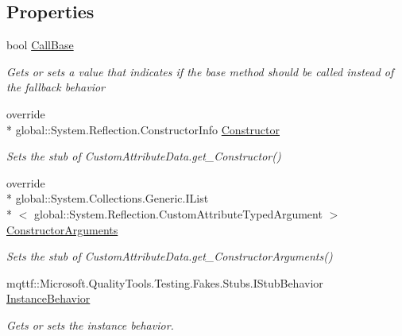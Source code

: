 \subsection*{Properties}
\begin{DoxyCompactItemize}
\item 
bool \hyperlink{class_system_1_1_reflection_1_1_fakes_1_1_stub_custom_attribute_data_a84a629870a52cfff5e484e0fcab8e341}{Call\-Base}
\begin{DoxyCompactList}\small\item\em Gets or sets a value that indicates if the base method should be called instead of the fallback behavior\end{DoxyCompactList}\item 
override \\*
global\-::\-System.\-Reflection.\-Constructor\-Info \hyperlink{class_system_1_1_reflection_1_1_fakes_1_1_stub_custom_attribute_data_a1681ed6a40caec10be6109b5d85ccddd}{Constructor}
\begin{DoxyCompactList}\small\item\em Sets the stub of Custom\-Attribute\-Data.\-get\-\_\-\-Constructor()\end{DoxyCompactList}\item 
override \\*
global\-::\-System.\-Collections.\-Generic.\-I\-List\\*
$<$ global\-::\-System.\-Reflection.\-Custom\-Attribute\-Typed\-Argument $>$ \hyperlink{class_system_1_1_reflection_1_1_fakes_1_1_stub_custom_attribute_data_a972bc18bb8e837fae6ce67a1703baeba}{Constructor\-Arguments}
\begin{DoxyCompactList}\small\item\em Sets the stub of Custom\-Attribute\-Data.\-get\-\_\-\-Constructor\-Arguments()\end{DoxyCompactList}\item 
mqttf\-::\-Microsoft.\-Quality\-Tools.\-Testing.\-Fakes.\-Stubs.\-I\-Stub\-Behavior \hyperlink{class_system_1_1_reflection_1_1_fakes_1_1_stub_custom_attribute_data_a6502c388ae7c6eca608011c286852847}{Instance\-Behavior}
\begin{DoxyCompactList}\small\item\em Gets or sets the instance behavior.\end{DoxyCompactList}\item 

\end{DoxyCompactItemize}
